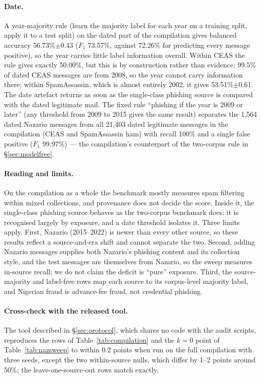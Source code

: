 \documentclass[twoside,11pt]{article}
\begin{document}
\paragraph{Date.} A year-majority rule (learn the majority label for each
year on a training split, apply it to a test split) on the dated part of the
compilation gives balanced accuracy 56.73\%$\pm$0.43 ($F_1$ 73.57\%, against
72.26\% for predicting every message positive), so the year carries little
label information overall. Within CEAS the rule gives exactly 50.00\%, but
this is by construction rather than evidence: 99.5\% of dated CEAS messages
are from 2008, so the year cannot carry information there; within SpamAssassin, which
is almost entirely 2002, it gives 53.51\%$\pm$0.61. The date artefact returns
as soon as the single-class phishing source is compared with the dated
legitimate mail. The fixed rule ``phishing if the year is 2009 or later'' (any
threshold from 2009 to 2015 gives the same result) separates the 1{,}564 dated Nazario messages from all 21{,}403 dated
legitimate messages in the compilation (CEAS and SpamAssassin ham) with
recall 100\% and a single false positive ($F_1$ 99.97\%) --- the compilation's
counterpart of the two-corpus rule in \S\ref{sec:modelfree}.

\paragraph{Reading and limits.} On the compilation as a whole the benchmark
mostly measures spam filtering within mixed collections, and provenance does
not decide the score. Inside it, the single-class phishing source behaves as
the two-corpus benchmark does: it is recognised largely by exposure, and a
date threshold isolates it. Three limits apply. First, Nazario (2015--2022)
is newer than every other source, so these results reflect a source-and-era
shift and cannot separate the two. Second, adding Nazario messages supplies
both Nazario's phishing content and its collection style, and the test
messages are themselves from Nazario, so the sweep measures in-source recall;
we do not claim the deficit is ``pure'' exposure. Third, the source-majority
and label-free rows map each source to its corpus-level majority label, and
Nigerian fraud is advance-fee fraud, not credential phishing.

\paragraph{Cross-check with the released tool.} The tool described in
\S\ref{sec:protocol}, which shares no code with the audit scripts, reproduces
the rows of Table~\ref{tab:compilation} and the $k=0$ point of
Table~\ref{tab:nazsweep} to within 0.2 points when run on the full
compilation with three seeds, except the two within-source nulls, which
differ by 1--2 points around 50\%; the leave-one-source-out rows match
exactly.
\end{document}
